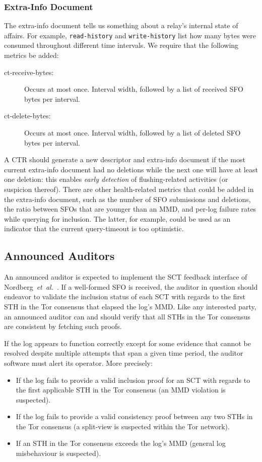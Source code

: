\subsubsection{Extra-Info Document}
The extra-info document tells us something about a relay's internal state of
affairs.  For example, \texttt{read-history} and \texttt{write-history} list how
many bytes were consumed throughout different time intervals.  We require that
the following metrics be added:
\begin{description}
	\item[ct-receive-bytes:] Occurs at most once.  Interval width, followed by a
		list of received SFO bytes per interval.
	\item[ct-delete-bytes:] Occurs at most once.  Interval width, followed by a
		list of deleted SFO bytes per interval.
\end{description}

A CTR should generate a new descriptor and extra-info document if the most
current extra-info document had no deletions while the next one will have at
least one deletion:
	this enables \emph{early detection} of flushing-related activities
	(or suspicion thereof).
There are other health-related metrics that could be added in the
extra-info document, such as
	the number of SFO submissions and deletions,
	the ratio between SFOs that are younger than an MMD, and
	per-log failure rates while querying for inclusion.
The latter, for example, could be used as an indicator that the current
query-timeout is too optimistic.

\subsection{Announced Auditors}
An announced auditor is expected to implement the SCT feedback interface of
Nordberg~\emph{et~al.}~\cite{nordberg}.  If a well-formed SFO is received, the
auditor in question should endeavor to validate the inclusion status of each SCT
with regards to the first STH in the Tor consensus that elapsed the log's MMD.
Like any interested party, an announced auditor can and should verify that all
STHs in the Tor consensus are consistent by fetching such proofs.

If the log appears to function correctly except for some evidence that cannot be
resolved despite multiple attempts that span a given time period, the auditor
software must alert its operator.  More precisely:
\begin{itemize}
	\item If the log fails to provide a valid inclusion proof for an SCT with
		regards to the first applicable STH in the Tor consensus
		(an MMD violation is suspected).
	\item If the log fails to provide a valid consistency proof between any two
		STHs in the Tor consensus
		(a split-view is suspected within the Tor network).
	\item If an STH in the Tor consensus exceeds the log's MMD (general log
		misbehaviour is suspected).
\end{itemize}

